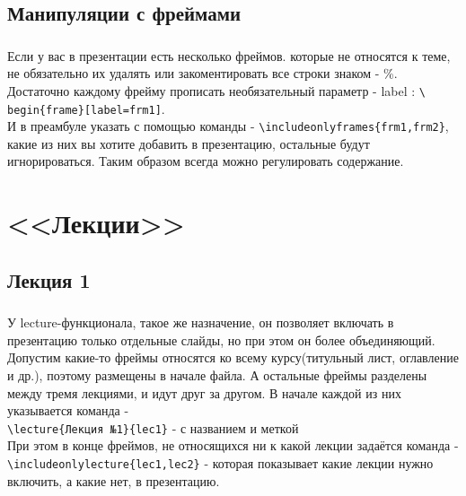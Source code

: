 \documentclass[aspectratio=169,
]{beamer}
\begin{document}
\subsection{Манипуляции с фреймами}

\begin{frame}[fragile, label=f20]
\frametitle{\insertsection}
\framesubtitle{\insertsubsection}
Если у вас в презентации есть несколько фреймов. которые не относятся к теме, не обязательно их удалять или закоментировать все строки знаком - \%. \\
Достаточно каждому фрейму прописать необязательный параметр - label : \verb|\ begin{frame}[label=frm1]|. \\
И в преамбуле указать с помощью команды - \verb|\includeonlyframes{frm1,frm2}|, какие из них вы хотите добавить в презентацию, остальные будут игнорироваться. Таким образом всегда можно регулировать содержание.
\end{frame}



\section{<<Лекции>>}


\subsection{Лекция 1}
\begin{frame}[fragile, label=f21]
\frametitle{\insertsection}
\framesubtitle{\insertsubsection}
У lecture-функционала, такое же назначение, он позволяет включать в презентацию только отдельные слайды, но при этом он более объединяющий. \\
Допустим какие-то фреймы относятся ко всему курсу(титульный лист, оглавление и др.), поэтому размещены в начале файла. А остальные фреймы разделены между тремя лекциями, и идут друг за другом. В начале каждой из них указывается команда - \\
\verb|\lecture{Лекция №1}{lec1}| - с названием и меткой\\
При этом в конце фреймов, не относящихся ни к какой лекции задаётся команда - \\
\verb|\includeonlylecture{lec1,lec2}| - которая показывает какие лекции нужно включить, а какие нет, в презентацию.
\end{frame}
\end{document}
